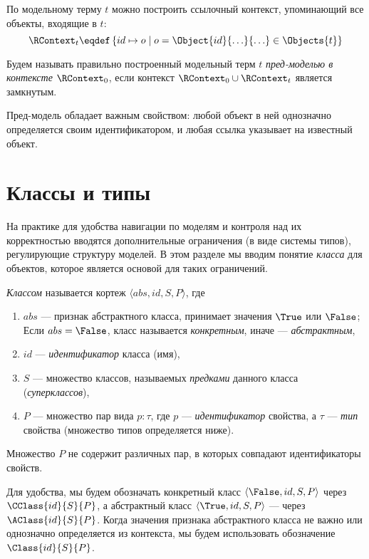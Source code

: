 По модельному терму $t$ можно построить ссылочный контекст, упоминающий все объекты, входящие в $t$:
$$
	\RContext_t \eqdef \left\{ id \mapsto o \;|\; o = \Object{id}{\ldots}{\ldots} \in \Objects{t}\right\}
$$

\begin{Def}
Будем называть правильно построенный модельный терм $t$ \emph{пред-моделью в контексте $\RContext_0$}, если контекст $\RContext_0 \cup \RContext_t$ является замкнутым.
\end{Def}

Пред-модель обладает важным свойством: любой объект в ней однозначно определяется своим идентификатором, и любая ссылка указывает на известный объект.

\section{Классы и типы}

На практике для удобства навигации по моделям и контроля над их корректностью вводятся дополнительные ограничения (в виде системы типов), регулирующие структуру моделей. В этом разделе мы вводим понятие \emph{класса} для объектов, которое является основой для таких ограничений. 

\begin{Def}[Класс]\label{defclass}
\emph{Классом} называется кортеж $\langle abs, id, S, P \rangle$, где 
\begin{enumerate}
\item $abs$ --- признак абстрактного класса, принимает значения $\True$ или $\False$; Если $abs = \False$, класс называется \emph{конкретным}, иначе --- \emph{абстрактным},
\item $id$ --- \emph{идентификатор} класса (имя),
\item $S$ --- множество классов, называемых \emph{предками} данного класса (\emph{суперклассов}),
\item $P$ --- множество пар вида $p : \tau$, где $p$ --- \emph{идентификатор} свойства, а $\tau$ --- \emph{тип} свойства (множество типов определяется ниже).
\end{enumerate}
Множество $P$ не содержит различных пар, в которых совпадают идентификаторы свойств.
\end{Def}

Для удобства, мы будем обозначать конкретный класс $\langle \False, id, S, P \rangle$ через \mbox{$\CClass{id}{S}{P}$}, а абстрактный класс $\langle \True, id, S, P \rangle$ --- через \mbox{$\AClass{id}{S}{P}$}. Когда значения признака абстрактного класса не важно или однозначно определяется из контекста, мы будем использовать обозначение \mbox{$\Class{id}{S}{P}$}.

